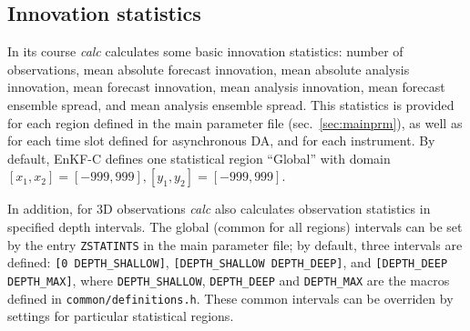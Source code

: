 \documentclass[11pt]{report}
\begin{document}
\subsection{Innovation statistics}

In its course \emph{calc} calculates some basic innovation statistics: number of observations, mean absolute forecast innovation, mean absolute analysis innovation, mean forecast innovation, mean analysis innovation, mean forecast ensemble spread, and mean analysis ensemble spread.
This statistics is provided for each region defined in the main parameter file (sec.~\ref{sec:mainprm}), as well as for each time slot defined for asynchronous DA, and for each instrument.
By default, EnKF-C defines one statistical region ``Global'' with domain $[x_1,x_2] = [-999,999], [y_1,y_2] = [-999,999]$.

In addition, for 3D observations \emph{calc} also calculates observation statistics in specified depth intervals.
The global (common for all regions) intervals can be set by the entry \verb|ZSTATINTS| in the main parameter file; by default, three intervals are defined: \verb|[0 DEPTH_SHALLOW]|, \verb|[DEPTH_SHALLOW DEPTH_DEEP]|, and \verb|[DEPTH_DEEP DEPTH_MAX]|, where \verb|DEPTH_SHALLOW|, \verb|DEPTH_DEEP| and \verb|DEPTH_MAX| are the macros defined in \verb|common/definitions.h|.
These common intervals can be overriden by settings for particular statistical regions.
\end{document}
